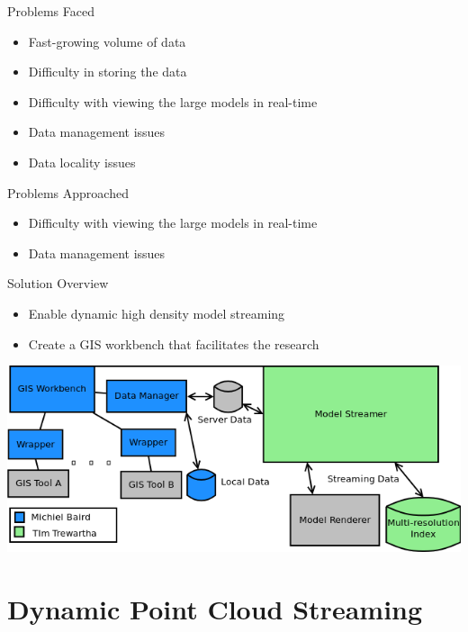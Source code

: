 \documentclass{beamer}
\begin{document}
\begin{frame}{Problems Faced}
\begin{itemize}
    \item Fast-growing volume of data
    \item Difficulty in storing the data
    \item Difficulty with viewing the large models in real-time
    \item Data management issues
    \item Data locality issues
\end{itemize}
\end{frame}


\begin{frame}{Problems Approached}
    \begin{itemize}
        \item Difficulty with viewing the large models in real-time
        \item Data management issues
    \end{itemize}
\end{frame}

\begin{frame}{Solution Overview}

\begin{itemize}
\item Enable dynamic high density model streaming
\item Create a GIS workbench that facilitates the research
    \end{itemize}
    \begin{center}
    \includegraphics[width=0.8\linewidth]{images/mainDiagram.png}
    \end{center}
\end{frame}

\section{Dynamic Point Cloud Streaming}
\end{document}
